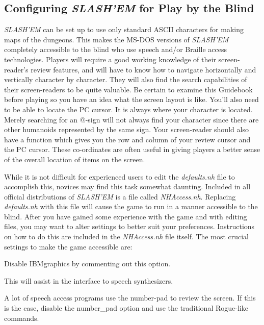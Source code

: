 \subsection*{Configuring {\it SLASH'EM\/} for Play by the Blind}


{\it SLASH'EM\/} can be set up to use only standard ASCII characters for making
maps of the dungeons. This makes the MS-DOS versions of {\it SLASH'EM\/} completely
accessible to the blind who use speech and/or Braille access technologies.
Players will require a good working knowledge of their screen-reader's
review features, and will have to know how to navigate horizontally and
vertically character by character. They will also find the search
capabilities of their screen-readers to be quite valuable. Be certain to
examine this Guidebook before playing so you have an idea what the screen
layout is like. You'll also need to be able to locate the PC cursor. It is
always where your character is located. Merely searching for an @-sign will
not always find your character since there are other humanoids represented
by the same sign. Your screen-reader should also have a function which
gives you the row and column of your review cursor and the PC cursor.
These co-ordinates are often useful in giving players a better sense of the
overall location of items on the screen.

While it is not difficult for experienced users to edit the {\it defaults.nh\/}
file to accomplish this, novices may find this task somewhat daunting.
Included in all official distributions of {\it SLASH'EM\/} is a file called
{\it NHAccess.nh}.  Replacing {\it defaults.nh\/} with this file will cause
the game to run in a manner accessible to the blind. After you have gained
some experience with the game and with editing files, you may want to alter
settings to better suit your preferences. Instructions on how to do this
are included in the {\it NHAccess.nh\/} file itself. The most crucial settings to
make the game accessible are:

\blist{}

\item[\ib{IBMgraphics}]
Disable IBMgraphics by commenting out this option.

\item[\ib{menustyle:traditional}]
This will assist in the interface to speech synthesizers.

\item[\ib{number\_pad}]
A lot of speech access programs use the number-pad to review the screen.
If this is the case, disable the number\_pad option and use the traditional
Rogue-like commands.


